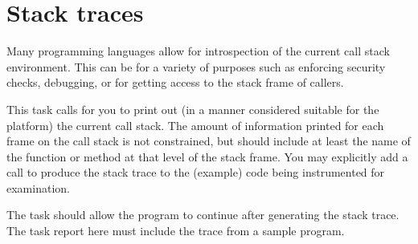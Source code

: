 \pagebreak{}
\section*{Stack traces}

Many programming languages allow for introspection of the current call
stack environment. This can be for a variety of purposes such as
enforcing security checks, debugging, or for getting access to the stack
frame of callers.

This task calls for you to print out (in a manner considered suitable
for the platform) the current call stack. The amount of information
printed for each frame on the call stack is not constrained, but should
include at least the name of the function or method at that level of the
stack frame. You may explicitly add a call to produce the stack trace to
the (example) code being instrumented for examination.

The task should allow the program to continue after generating the stack
trace. The task report here must include the trace from a sample
program. 


